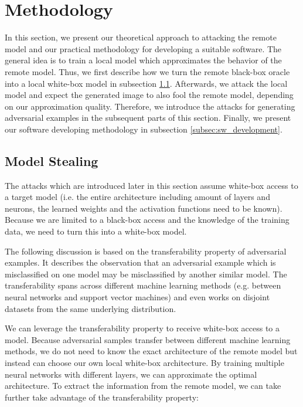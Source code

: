 
\section{Methodology}\label{sec:methodology}

In this section, we present our theoretical approach to attacking the remote model and our practical methodology for developing a suitable software.
The general idea is to train a local model which approximates the behavior of the remote model.
Thus, we first describe how we turn the remote black-box oracle into a local white-box model in subsection \ref{subsec:modelstealing}.
Afterwards, we attack the local model and expect the generated image to also fool the remote model, depending on our approximation quality.
Therefore, we introduce the attacks for generating adversarial examples in the subsequent parts of this section.
Finally, we present our software developing methodology in subsection \ref{subsec:sw_development}.

\subsection{Model Stealing}\label{subsec:modelstealing}

The attacks which are introduced later in this section assume white-box access to a target model (i.e. the entire architecture including amount of layers and neurons, the learned weights and the activation functions need to be known).
Because we are limited to a black-box access and the knowledge of the training data, we need to turn this into a white-box model.

The following discussion is based on the transferability property of adversarial examples.
It describes the observation that an adversarial example which is misclassified on one model may be misclassified by another similar model.
The transferability spans across different machine learning methods (e.g. between neural networks and support vector machines) and even works on disjoint datasets from the same underlying distribution. \cite{papernot2016transferability,goodfellow6572explaining, szegedy2013intriguing}

We can leverage the transferability property to receive white-box access to a model.
Because adversarial samples transfer between different machine learning methods, we do not need to know the exact architecture of the remote model but instead can choose our own local white-box architecture.
By training multiple neural networks with different layers, we can approximate the optimal architecture.
To extract the information from the remote model, we can take further take advantage of the transferability property:

